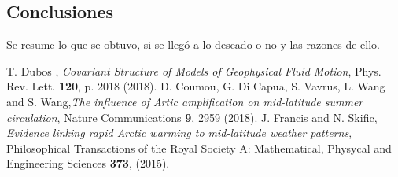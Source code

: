\documentclass[twoside]{article} %
\begin{document}
\begin{multicols}{2}
\section{Conclusiones}

Se resume lo que se obtuvo, si se llegó a lo deseado o no y las razones de ello.

\begin{thebibliography}{99}

 T. Dubos ,\textit{	Covariant Structure of Models of Geophysical Fluid Motion},
Phys. Rev. Lett. {\bf 120}, p. 2018 (2018).
 D. Coumou, G. Di Capua, S. Vavrus, L. Wang and S. Wang,\textit{The influence of Artic amplification on mid-latitude summer circulation},
Nature Communications  {\bf 9}, 2959 (2018).
 J. Francis and N. Skific,\textit{	Evidence linking rapid Arctic warming to mid-latitude weather patterns},
Philosophical Transactions of the Royal Society A: Mathematical, Physycal and Engineering Sciences  {\bf 373}, (2015).
 
\end{thebibliography}

\end{multicols}
\end{document}
